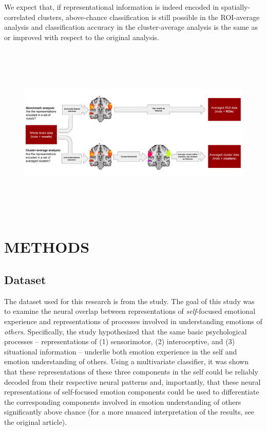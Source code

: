 \documentclass[jou,12pt,a4paper]{apa6}
\begin{document}
We expect that, if representational information is indeed encoded in spatially-correlated clusters, above-chance classification is still possible in the ROI-average analysis and classification accuracy in the cluster-average analysis is the same as or improved with respect to the original analysis.

\begin{figure}[ht]
\centering
\includegraphics[width=\textwidth,height=8.5cm]{methods}
\end{figure}

\section{METHODS}

\subsection{Dataset}
The dataset used for this research is from the  study. The goal of this study was to examine the neural overlap between representations of \emph{self}-focused emotional experience and representations of processes involved in understanding emotions of \emph{others}. Specifically, the study hypothesized that the same basic psychological processes -- representations of (1) sensorimotor, (2) interoceptive, and (3) situational information -- underlie both emotion experience in the self and emotion understanding of others. Using a multivariate classifier, it was shown that these representations of these three components in the self could be reliably decoded from their respective neural patterns and, importantly, that these neural representations of self-focused emotion components could be used to differentiate the corresponding components involved in emotion understanding of others significantly above chance (for a more nuanced interpretation of the results, see the original article).
\end{document}
